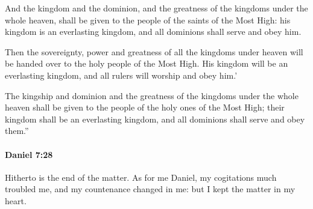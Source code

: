 			\begin{versebox}
					\item[BHS] 
					\item[LXX] 
					\item[ASV] And the kingdom and the dominion, and the greatness of the kingdoms under the whole heaven, shall be given to the people of the saints of the Most High: his kingdom is an everlasting kingdom, and all dominions shall serve and obey him.
					\item[NIV] Then the sovereignty, power and greatness of all the kingdoms under heaven will be handed over to the holy people of the Most High. His kingdom will be an everlasting kingdom, and all rulers will worship and obey him.’
					\item[NRSV] The kingship and dominion and the greatness of the kingdoms under the whole heaven shall be given to the people of the holy ones of the Most High; their kingdom shall be an everlasting kingdom, and all dominions shall serve and obey them.”
			\end{versebox}

		\paragraph{Daniel 7:28} %
			\label{DANIEL-7-28}

			Hitherto is the end of the matter. As for me Daniel, my cogitations much troubled me, and my countenance changed in me: but I kept the matter in my heart.

